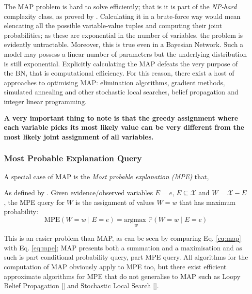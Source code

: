 The MAP problem is hard to solve efficiently; that is it is part of the \textit{NP-hard} complexity class, as proved by \cite{Shimony1994}.
Calculating it in a brute-force way would mean elencating all the possible variable-value tuples and computing their joint probabilities; as these are exponential in the number of variables, the problem is evidently untractable.
Moreover, this is true even in a Bayesian Network.  
Such a model may possess a linear number of parameters but the underlying distribution is still exponential.
Explicitly calculating the MAP defeats the very purpose of the BN, that is computational efficiency.
For this reason, there exist a host of approaches to optimising MAP: elimination algorithms, gradient methods, simulated annealing and other stochastic local searches, belief propagation and integer linear programming.

\textbf{A very important thing to note is that the greedy assignment where each variable picks its most likely value can be very different from the most likely joint assignment of all variables.}

\subsubsection{Most Probable Explanation Query}
A special case of MAP is the \textit{Most probable explanation (MPE)} that, 
\begin{definition}
	As defined by \cite{koller2007introduction}.
 Given evidence/observed variables $E=e$, $E \subseteq \mathcal{X}$ and $W = \mathcal{X} - E$, the MPE query for $W$ is the assignment of values $W=w$ that has maximum probability:
	\begin{equation} \label{eq:mpe}
	\text{MPE}( W=w \mid E=e ) = \underset{w}{\text{argmax }} \mathbb{P}(W=w \mid E=e)
\end{equation}
\end{definition}

This is an easier problem than MAP, as can be seen by comparing Eq. \ref{eq:map} with Eq. \ref{eq:mpe}; MAP presents both a summation and a maximisation and as such is part conditional probability query, part MPE query.
All algorithms for the computation of MAP obviously apply to MPE too, but there exist efficient approximate algorithms for MPE that do not generalise to MAP such as Loopy Belief Propagation [\cite{Pearl1988}] and Stochastic Local Search [\cite{Kask1999}].


